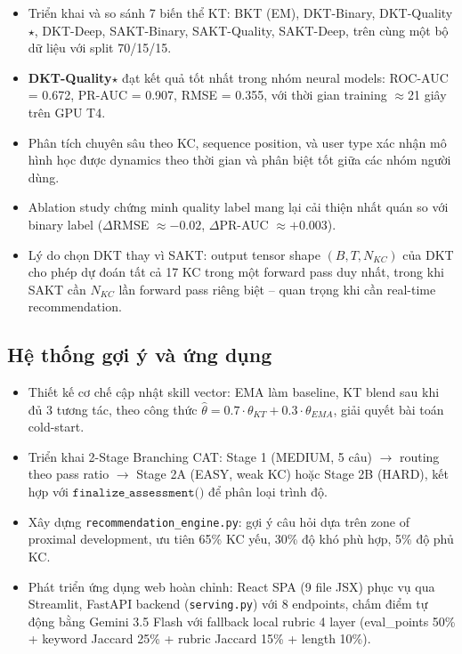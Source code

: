 \begin{itemize}
  \item Triển khai và so sánh 7 biến thể KT: BKT (EM), DKT-Binary, DKT-Quality$\star$, DKT-Deep, SAKT-Binary, SAKT-Quality, SAKT-Deep, trên cùng một bộ dữ liệu với split 70/15/15.
  \item \textbf{DKT-Quality$\star$} đạt kết quả tốt nhất trong nhóm neural models: ROC-AUC = 0.672, PR-AUC = 0.907, RMSE = 0.355, với thời gian training $\approx$21 giây trên GPU T4.
  \item Phân tích chuyên sâu theo KC, sequence position, và user type xác nhận mô hình học được dynamics theo thời gian và phân biệt tốt giữa các nhóm người dùng.
  \item Ablation study chứng minh quality label mang lại cải thiện nhất quán so với binary label ($\Delta$RMSE $\approx -0.02$, $\Delta$PR-AUC $\approx +0.003$).
  \item Lý do chọn DKT thay vì SAKT: output tensor shape $(B, T, N_{KC})$ của DKT cho phép dự đoán tất cả 17 KC trong một forward pass duy nhất, trong khi SAKT cần $N_{KC}$ lần forward pass riêng biệt -- quan trọng khi cần real-time recommendation.
\end{itemize}

\subsection{Hệ thống gợi ý và ứng dụng}

\begin{itemize}
  \item Thiết kế cơ chế cập nhật skill vector: EMA làm baseline, KT blend sau khi đủ 3 tương tác, theo công thức $\hat{\theta} = 0.7 \cdot \theta_{KT} + 0.3 \cdot \theta_{EMA}$, giải quyết bài toán cold-start.
  \item Triển khai 2-Stage Branching CAT: Stage 1 (MEDIUM, 5 câu) $\to$ routing theo pass ratio $\to$ Stage 2A (EASY, weak KC) hoặc Stage 2B (HARD), kết hợp với $\texttt{finalize\_assessment()}$ để phân loại trình độ.
  \item Xây dựng \texttt{recommendation\_engine.py}: gợi ý câu hỏi dựa trên zone of proximal development, ưu tiên 65\% KC yếu, 30\% độ khó phù hợp, 5\% độ phủ KC.
  \item Phát triển ứng dụng web hoàn chỉnh: React SPA (9 file JSX) phục vụ qua Streamlit, FastAPI backend (\texttt{serving.py}) với 8 endpoints, chấm điểm tự động bằng Gemini 3.5 Flash với fallback local rubric 4 layer (eval\_points 50\% + keyword Jaccard 25\% + rubric Jaccard 15\% + length 10\%).
\end{itemize}


